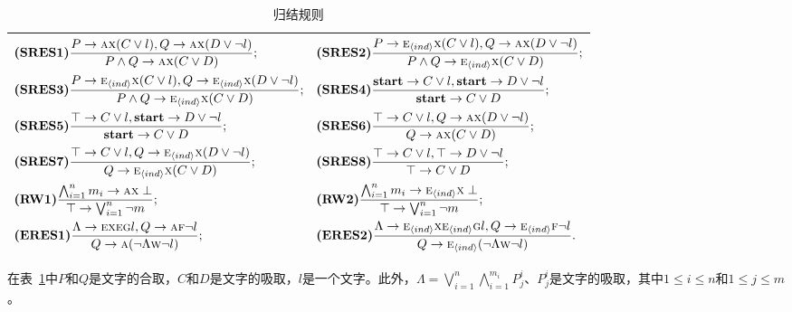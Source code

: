 \begin{table}[tb]%
	\small
	\centering
	\caption{归结规则}\label{tab:res}
	\begin{tabular}{l}
		\toprule
		$
		\begin{aligned}
			& \textbf{(SRES1)}\frac{P\rightarrow \textsc{a}\textsc{x}(C\vee l), Q\rightarrow \textsc{a}\textsc{x}(D\vee \neg l)}{P\wedge Q \rightarrow \textsc{a}\textsc{x}(C\vee D)};
			&& \textbf{(SRES2)} \frac{P\rightarrow \textsc{e}_{{\langle{ind}\rangle}} \textsc{x}(C\vee l), Q\rightarrow \textsc{a}\textsc{x}(D\vee \neg l)}{P\wedge Q \rightarrow \textsc{e}_{{\langle{ind}\rangle}}\textsc{x}(C\vee D)};\\
			& \textbf{(SRES3)} \frac{P\rightarrow \textsc{e}_{{\langle{ind}\rangle}}\textsc{x}(C\vee l), Q \rightarrow \textsc{e}_{{\langle{ind}\rangle}}\textsc{x}(D\vee \neg l)}{P\wedge Q\rightarrow\textsc{e}_{{\langle{ind}\rangle}}\textsc{x}(C\vee D)};  
			&&   \textbf{(SRES4)} \frac{\textbf{start} \rightarrow C\vee l, \textbf{start} \rightarrow D \vee \neg l}{\textbf{start} \rightarrow C\vee D}; \\
			& \textbf{(SRES5)} \frac{\top \rightarrow C\vee l, \textbf{start} \rightarrow D \vee \neg l}{\textbf{start} \rightarrow C \vee D};
			&&  \textbf{(SRES6)} \frac{\top \rightarrow C \vee l, Q \rightarrow \textsc{a}\textsc{x}(D \vee \neg l)}{Q\rightarrow \textsc{a} \textsc{x}(C\vee D)}; \\
			& \textbf{(SRES7)} \frac{\top \rightarrow C \vee l, Q \rightarrow \textsc{e}_{{\langle{ind}\rangle}} \textsc{x}(D \vee \neg l)}{Q\rightarrow \textsc{e}_{{\langle{ind}\rangle}}\textsc{x}(C\vee D)}; 
			&&  \textbf{(SRES8)} \frac{\top \rightarrow C\vee l, \top \rightarrow D \vee \neg l}{\top \rightarrow C \vee D};\\
			& \textbf{(RW1)} \frac{\bigwedge_{i=1}^n m_i \rightarrow \textsc{a}\textsc{x} \perp}{\top \rightarrow \bigvee_{i=1}^n \neg m}; 
			&& \textbf{(RW2)} \frac{\bigwedge_{i=1}^n m_i \rightarrow \textsc{e}_{{\langle{ind}\rangle}}\textsc{x} \perp}{\top \rightarrow \bigvee_{i=1}^n \neg m}; \\
			& \textbf{(ERES1)} \frac{\Lambda \rightarrow \textsc{e} \textsc{x} \textsc{e}\textsc{g} l, Q \rightarrow \textsc{a} \textsc{f} \neg l}{Q \rightarrow \textsc{a}(\neg \Lambda \textsc{w} \neg l)};
			&& \textbf{(ERES2)} \frac{\Lambda \rightarrow \textsc{e}_{{\langle{ind}\rangle}} \textsc{x} \textsc{e}_{{\langle{ind}\rangle}}\textsc{g} l, Q \rightarrow \textsc{e}_{{\langle{ind}\rangle}} \textsc{f} \neg l}{Q \rightarrow \textsc{e}_{{\langle{ind}\rangle}}(\neg \Lambda \textsc{w} \neg l)}.
		\end{aligned}
		$\\
		\bottomrule
	\end{tabular}
\end{table}
在表~\ref{tab:res}中$P$和$Q$是文字的合取，$C$和$D$是文字的吸取，$l$是一个文字。此外，$\Lambda=\bigvee_{i=1}^n \bigwedge_{i=1}^{m_i}P_j^i$、$P_j^i$是文字的吸取，其中$1\leq i\leq n$和$1\leq j\leq m$。

